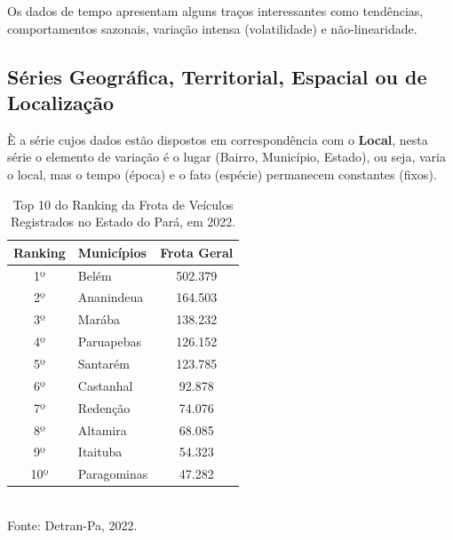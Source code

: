 Os dados de tempo apresentam alguns traços interessantes como tendências, comportamentos sazonais, variação intensa (volatilidade) e não-linearidade.\vskip0.3cm






\newpage

\subsection{Séries Geográfica, Territorial, Espacial ou de Localização}

\inic È a série cujos dados estão dispostos em correspondência com o \textbf{Local}, nesta série o elemento de variação é o lugar (Bairro, Município, Estado), ou seja, varia o local, mas o tempo (época) e o fato (espécie) permanecem constantes (fixos).



\begin{table}[!htb]
    \centering
    {
    \caption{Top 10 do Ranking da Frota de Veículos Registrados no Estado do Pará, em 2022.}
    \label{obitos2}
    \vspace{0.1cm}
\begin{tabular}{c|l|c}
  \hline\hline
  Ranking   & Municípios    & Frota Geral  \\
  \hline\hline
  1º        & Belém         &  502.379 \\
  2º        & Ananindeua    &  164.503 \\
  3º        & Marába        &  138.232 \\
  4º        & Paruapebas    &  126.152 \\
  5º        & Santarém      &  123.785 \\
  6º        & Castanhal     &  92.878 \\
  7º        & Redenção      & 74.076  \\
  8º        & Altamira      & 68.085 \\
  9º        & Itaituba      & 54.323 \\
  10º       & Paragominas   & 47.282 \\
  \hline\hline
\end{tabular}}
\\
\hspace{-2.0cm}
Fonte: Detran-Pa, 2022.
\end{table}

\newpage

